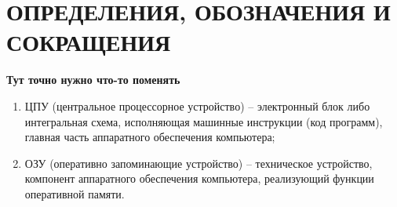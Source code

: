 \section*{ОПРЕДЕЛЕНИЯ, ОБОЗНАЧЕНИЯ И СОКРАЩЕНИЯ}

\textbf{Тут точно нужно что-то поменять}

\begin{enumerate}
	\item ЦПУ (центральное процессорное устройство)  -- электронный блок либо интегральная схема, исполняющая машинные инструкции (код программ), главная часть аппаратного обеспечения компьютера;

	\item ОЗУ (оперативно запоминающие устройство) -- техническое устройство, компонент аппаратного обеспечения компьютера, реализующий функции оперативной памяти.
\end{enumerate}

\pagebreak